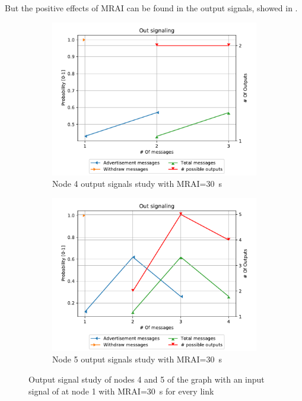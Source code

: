 But the positive effects of \ac{MRAI} can be found in the output signals,
showed in .

\begin{figure}[h]
     \centering
     \begin{subfigure}[b]{0.45\textwidth}
         \centering
         \includegraphics[width=\textwidth]{images/signal_study/fig_4_MRAI/fig_4_4_signaling_nmessage_prob.pdf}
		 \caption{Node \num{4} output signals study with \ac{MRAI}=\SI{30}{\second}}
         \label{fig:signal_node4_MRAI}
     \end{subfigure}
     \hfill
     \begin{subfigure}[b]{0.45\textwidth}
         \centering
         \includegraphics[width=\textwidth]{images/signal_study/fig_4_MRAI/fig_4_5_signaling_nmessage_prob.pdf}
		 \caption{Node \num{5} output signals study with \ac{MRAI}=\SI{30}{\second}}
         \label{fig:signal_node5_MRAI}
     \end{subfigure}
		\caption{Output signal study of nodes \num{4} and \num{5} of the graph
			 with an input signal of  at node \num{1}
			with \ac{MRAI}=\SI{30}{\second} for every link}
        \label{fig:signal_griffin_fig4_MRAI}
\end{figure}

